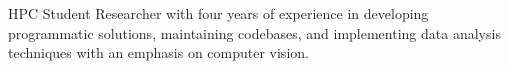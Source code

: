 
HPC Student Researcher with four years of experience in developing programmatic
solutions, maintaining codebases, and implementing data analysis techniques
with an emphasis on computer vision.
